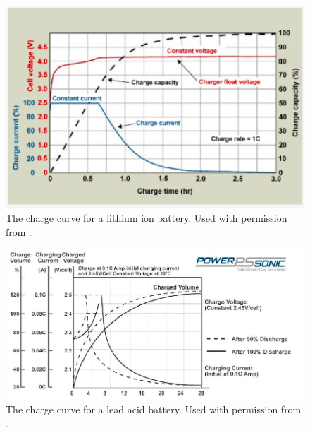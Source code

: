 \begin{figure}
    \centering
    \includegraphics[scale=0.5]{figures/lithium charge curve.png}
    \caption{The charge curve for a lithium ion battery. Used with permission from \cite{lith-charge-ref}.}
    \label{fig:lithium-charge-curve} 
\end{figure}

\begin{figure}
    \centering
    \includegraphics[scale=0.5]{figures/lead acid charge curve.png}
    \caption{The charge curve for a lead acid battery. Used with permission from \cite{lead-charge-ref}.}
    \label{fig:lead-acid-charge-curve} 
\end{figure}
